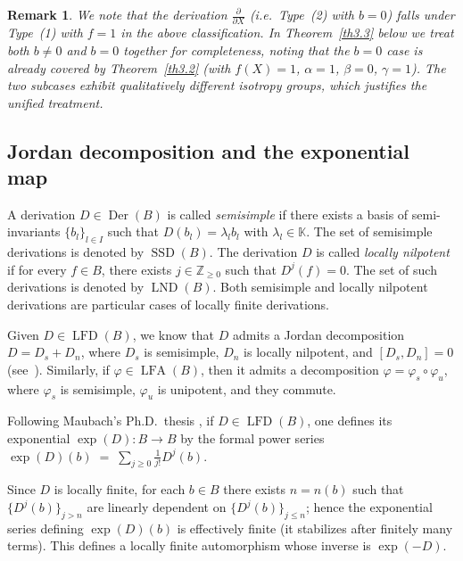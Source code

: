 \documentclass[11pt,a4paper,reqno]{amsart}
\newtheorem{remark}[theorem]{Remark}}
\begin{document}
\begin{remark}
We note that the derivation $\tfrac{\partial}{\partial X}$ (i.e.\ Type~(2) with $b=0$) falls under Type~(1) with $f=1$ in the above classification. In Theorem~\ref{th3.3} below we treat both $b\neq 0$ and $b=0$ together for completeness, noting that the $b=0$ case is already covered by Theorem~\ref{th3.2} (with $f(X)=1$, $\alpha=1$, $\beta=0$, $\gamma=1$). The two subcases exhibit qualitatively different isotropy groups, which justifies the unified treatment.
\end{remark}

\subsection{Jordan decomposition and the exponential map}

A derivation $D \in \operatorname{Der}(B)$ is called \emph{semisimple} if there exists a basis of semi-invariants $\{b_l\}_{l \in I}$ such that $D(b_l) = \lambda_l b_l$ with $\lambda_l \in \mathbb{K}$. The set of semisimple derivations is denoted by $\operatorname{SSD}(B)$. The derivation $D$ is called \emph{locally nilpotent} if for every $f \in B$, there exists $j \in \mathbb{Z}_{\geq 0}$ such that $D^j(f) = 0$. The set of such derivations is denoted by $\operatorname{LND}(B)$. Both semisimple and locally nilpotent derivations are particular cases of locally finite derivations.

Given $D \in \operatorname{LFD}(B)$, we know that $D$ admits a Jordan decomposition $D = D_s + D_n$, where $D_s$ is semisimple, $D_n$ is locally nilpotent, and $[D_s, D_n] = 0$ (see~\cite[Proposition~1.3.13]{van2000polynomial}). Similarly, if $\varphi \in \operatorname{LFA}(B)$, then it admits a decomposition $\varphi = \varphi_s \circ \varphi_u$, where $\varphi_s$ is semisimple, $\varphi_u$ is unipotent, and they commute.

Following Maubach's Ph.D.\ thesis \cite{Maubach03}, if $D \in \operatorname{LFD}(B)$, one defines its exponential  \linebreak
\(\exp(D)\colon B \to B\) 
by the formal power series
$\displaystyle\exp(D)(b) \;=\; \sum_{j \geq 0} \frac{1}{j!} D^j(b)$.

Since $D$ is locally finite, for each $b \in B$ there exists 
$n = n(b)$ such that $\{D^j(b)\}_{j>n}$ are linearly dependent on $\{D^j(b)\}_{j \le n}$; 
hence the exponential series defining $\exp(D)(b)$ is effectively finite (it stabilizes after finitely many terms).
This defines a locally finite automorphism whose inverse is $\exp(-D)$.
\end{document}
